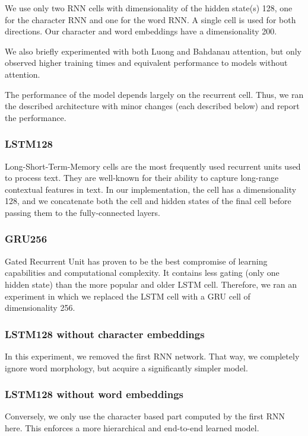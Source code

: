 \documentclass[10pt,conference,compsocconf]{IEEEtran}
\begin{document}
We use only two RNN cells with dimensionality of the hidden state(s) 128, one for the character RNN and one for the word RNN. A single cell is used for both directions. Our character and word embeddings have a dimensionality 200. 

We also briefly experimented with both Luong \cite{luong} and Bahdanau \cite{bahdanau} attention, but only observed higher training times and equivalent performance to models without attention.

The performance of the model depends largely on the recurrent cell. Thus, we ran the described architecture with minor changes (each described below) and report the performance.

\subsubsection{LSTM128}
Long-Short-Term-Memory \cite{lstm} cells are the most frequently used recurrent units used to process text. They are well-known for their ability to capture long-range contextual features in text. In our implementation, the cell has a dimensionality 128, and we concatenate both the cell and hidden states of the final cell before passing them to the fully-connected layers.

\subsubsection{GRU256}
Gated Recurrent Unit \cite{gru} has proven to be the best compromise of learning capabilities and computational complexity. It contains less gating (only one hidden state) than the more popular and older LSTM cell. Therefore, we ran an experiment in which we replaced the LSTM cell with a GRU cell of dimensionality 256.

\subsubsection{LSTM128 without character embeddings}
In this experiment, we removed the first RNN network. That way, we completely ignore word morphology, but acquire a significantly simpler model.

\subsubsection{LSTM128 without word embeddings}
Conversely, we only use the character based part computed by the first RNN here. This enforces a more hierarchical and end-to-end learned model.
\end{document}
